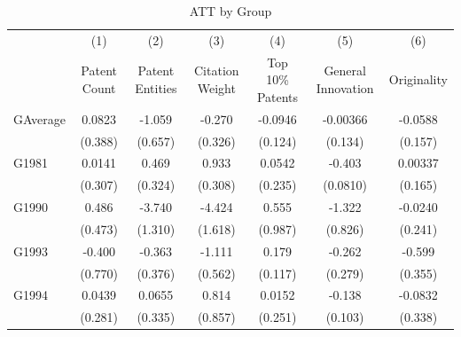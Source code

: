 \begin{table}[h!]
\centering
\caption{ATT by Group}
\label{tab:group}
\begin{tabular}{l*{6}{c}}
\hline\hline
                    &\multicolumn{1}{c}{(1)}&\multicolumn{1}{c}{(2)}&\multicolumn{1}{c}{(3)}&\multicolumn{1}{c}{(4)}&\multicolumn{1}{c}{(5)}&\multicolumn{1}{c}{(6)}\\
                    &\multicolumn{1}{c}{Patent Count}&\multicolumn{1}{c}{Patent Entities}&\multicolumn{1}{c}{Citation Weight}&\multicolumn{1}{c}{Top 10\% Patents}&\multicolumn{1}{c}{General Innovation}&\multicolumn{1}{c}{Originality}\\
\hline
GAverage            &      0.0823         &      -1.059         &      -0.270         &     -0.0946         &    -0.00366         &     -0.0588         \\
                    &     (0.388)         &     (0.657)         &     (0.326)         &     (0.124)         &     (0.134)         &     (0.157)         \\
[1em]
G1981               &      0.0141         &       0.469         &       0.933\sym{***}&      0.0542         &      -0.403\sym{***}&     0.00337         \\
                    &     (0.307)         &     (0.324)         &     (0.308)         &     (0.235)         &    (0.0810)         &     (0.165)         \\
[1em]
G1990               &       0.486         &      -3.740\sym{***}&      -4.424\sym{***}&       0.555         &      -1.322         &     -0.0240         \\
                    &     (0.473)         &     (1.310)         &     (1.618)         &     (0.987)         &     (0.826)         &     (0.241)         \\
[1em]
G1993               &      -0.400         &      -0.363         &      -1.111\sym{**} &       0.179         &      -0.262         &      -0.599\sym{*}  \\
                    &     (0.770)         &     (0.376)         &     (0.562)         &     (0.117)         &     (0.279)         &     (0.355)         \\
[1em]
G1994               &      0.0439         &      0.0655         &       0.814         &      0.0152         &      -0.138         &     -0.0832         \\
                    &     (0.281)         &     (0.335)         &     (0.857)         &     (0.251)         &     (0.103)         &     (0.338)         \\

\end{tabular}
\end{table}
